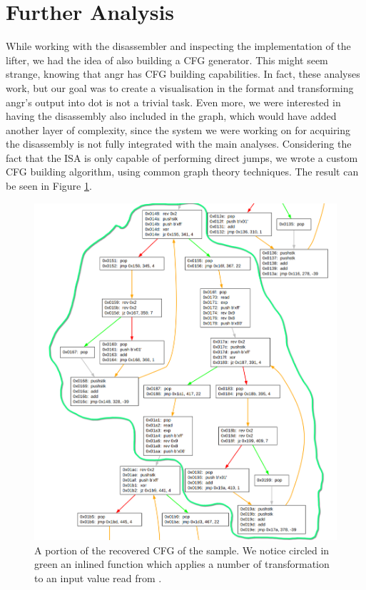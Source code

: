 \section{Further Analysis}

While working with the disassembler and inspecting the implementation of the  lifter, we had the idea of also building a \gls{CFG} generator. This might seem strange, knowing that angr has \gls{CFG} building capabilities. In fact, these analyses work, but our goal was to create a visualisation in the  format and transforming angr's output into dot is not a trivial task. Even more, we were interested in having the disassembly also included in the graph, which would have added another layer of complexity, since the system we were working on for acquiring the disassembly is not fully integrated with the main analyses. Considering the fact that the  \gls{ISA} is only capable of performing direct jumps, we wrote a custom \gls{CFG} building algorithm, using common graph theory techniques. The result can be seen in Figure \ref{fig:cfg_bytecode}.

\begin{figure}[ht]
    \centering
    \includegraphics[width=.8\textwidth]{./images/cfg}
    \caption{A portion of the recovered \gls{CFG} of the  sample. We notice circled in green an inlined function which applies a number of transformation to an input value read from .}
    \label{fig:cfg_bytecode}
\end{figure}


